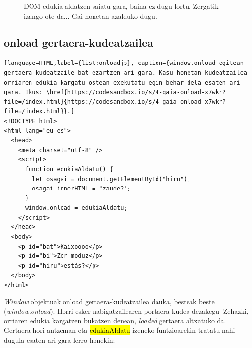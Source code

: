 \begin{figure}[ht]
	\centering
{}
\caption{DOM edukia aldatzen saiatu gara, baina ez dugu lortu. Zergatik izango ote da... Gai honetan  azalduko dugu.}
\label{fig:no-onload}
\end{figure}

\subsection{onload gertaera-kudeatzailea}

\begin{lstlisting}[language=HTML,label={list:onloadjs}, caption={window.onload egitean gertaera-kudeatzaile bat ezartzen ari gara. Kasu honetan kudeatzailea orriaren edukia kargatu ostean exekutatu egin behar dela esaten ari gara. Ikus: \href{https://codesandbox.io/s/4-gaia-onload-x7wkr?file=/index.html}{https://codesandbox.io/s/4-gaia-onload-x7wkr?file=/index.html}}.]
<!DOCTYPE html>
<html lang="eu-es">
  <head>
    <meta charset="utf-8" />
    <script>
      function edukiaAldatu() {
        let osagai = document.getElementById("hiru");
        osagai.innerHTML = "zaude?";
      }
      window.onload = edukiaAldatu;
    </script>
  </head>
  <body>
    <p id="bat">Kaixoooo</p>
    <p id="bi">Zer moduz</p>
    <p id="hiru">estás?</p>
  </body>
</html>
\end{lstlisting}


\textit{Window} objektuak onload gertaera-kudeatzailea dauka, besteak beste (\textit{window.onload}). Horri esker nabigatzailearen portaera kudea dezakegu. Zehazki, orriaren edukia kargatzen bukatzen denean, \textit{loaded} gertaera altxatuko da. Gertaera hori antzeman eta \hl{edukiaAldatu} izeneko funtzioarekin tratatu nahi dugula esaten ari gara lerro honekin:

